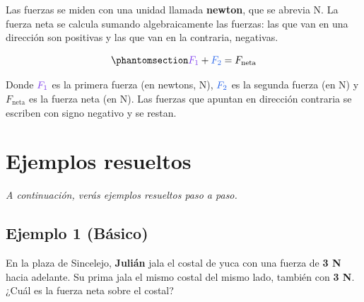 \documentclass[
  spanish,
  letterpaper,
  12pt,
  oneside,
  open=any,
  DIV=15]{scrbook}
\newcommand{\setcolorsection}[2]{%
  \definecolor{currentsectionbg}{HTML}{#1}%
  \definecolor{currentsectionborder}{HTML}{#2}%
}
\begin{document}
Las fuerzas se miden con una unidad llamada \textbf{newton}, que se
abrevia N. La fuerza neta se calcula sumando algebraicamente las
fuerzas: las que van en una dirección son positivas y las que van en la
contraria, negativas.

\begin{tcolorbox}[enhanced jigsaw, arc=.35mm, bottomrule=.15mm, bottomtitle=1mm, breakable, colback=white, colbacktitle=quarto-callout-important-color!10!white, colframe=quarto-callout-important-color-frame, coltitle=black, left=2mm, leftrule=.75mm, opacityback=0, opacitybacktitle=0.6, rightrule=.15mm, title=\textcolor{quarto-callout-important-color}{\faExclamation}\hspace{0.5em}{Ecuación 1: Fuerza neta}, titlerule=0mm, toprule=.15mm, toptitle=1mm]

\begin{equation}\protect\phantomsection\label{eq-fuerza-neta}{
\textcolor[HTML]{7C3AED}{F_1} + \textcolor[HTML]{2563EB}{F_2} = F_{\text{neta}}
}\end{equation}

Donde \(\textcolor[HTML]{7C3AED}{F_1}\) es la primera fuerza (en
newtons, \(\text{N}\)), \(\textcolor[HTML]{2563EB}{F_2}\) es la segunda
fuerza (en \(\text{N}\)) y \(F_{\text{neta}}\) es la fuerza neta (en
\(\text{N}\)). Las fuerzas que apuntan en dirección contraria se
escriben con signo negativo y se restan.

\end{tcolorbox}

\setcolorsection{b3d9f0}{94c4e0}

\section{Ejemplos resueltos}\label{ejemplos-resueltos-2}

\emph{A continuación, verás ejemplos resueltos paso a paso.}

\subsection{Ejemplo 1 (Básico)}\label{ejemplo-1-buxe1sico-2}

\begin{tcolorbox}[enhanced jigsaw, arc=.35mm, bottomrule=.15mm, bottomtitle=1mm, breakable, colback=white, colbacktitle=quarto-callout-note-color!10!white, colframe=quarto-callout-note-color-frame, coltitle=black, left=2mm, leftrule=.75mm, opacityback=0, opacitybacktitle=0.6, rightrule=.15mm, title=\textcolor{quarto-callout-note-color}{\faInfo}\hspace{0.5em}{Paso 1: Problema}, titlerule=0mm, toprule=.15mm, toptitle=1mm]

En la plaza de Sincelejo, \textcolor[HTML]{7C3AED}{\textbf{Julián}} jala
el costal de yuca con una fuerza de \textcolor[HTML]{7C3AED}{\textbf{3
N}} hacia adelante. Su prima jala el mismo costal del mismo lado,
también con \textcolor[HTML]{2563EB}{\textbf{3 N}}. ¿Cuál es la fuerza
neta sobre el costal?

\end{tcolorbox}
\end{document}
